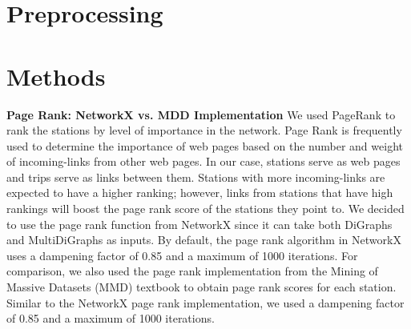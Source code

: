 \documentclass{article}
\begin{document}
\section{Preprocessing}

\section{Methods}
\textbf{Page Rank: NetworkX vs. MDD Implementation}
\newline
We used PageRank to rank the stations by level of importance in the network. Page Rank is frequently used to determine the importance of web pages based on the number and weight of incoming-links from other web pages. In our case, stations serve as web pages and trips serve as links between them. Stations with more incoming-links are expected to have a higher ranking; however, links from stations that have high rankings will boost the page rank score of the stations they point to.
\newline
We decided to use the page rank function from NetworkX since it can take both DiGraphs and MultiDiGraphs as inputs. By default, the page rank algorithm in NetworkX uses a dampening factor of 0.85 and a maximum of 1000 iterations. For comparison, we also used the page rank implementation from the Mining of Massive Datasets (MMD) textbook to obtain page rank scores for each station. Similar to the NetworkX page rank implementation, we used a dampening factor of 0.85  and a maximum of 1000 iterations.
\end{document}
